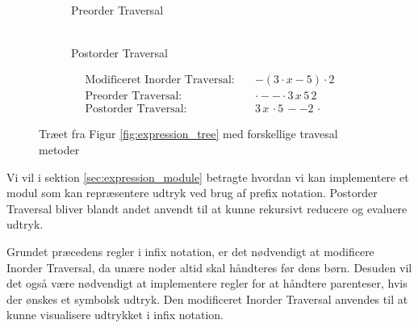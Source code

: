 \begin{figure}[H]
\begin{subfigure}{0.3\textwidth}
    \caption{\\Preorder Traversal}
  \end{subfigure}
  \hfill
  \begin{subfigure}{0.3\textwidth}
    \centering
    \caption{\\Postorder Traversal}
  \end{subfigure}
  \begin{align*}
      \text{Modificeret Inorder Traversal:} \quad & - (3 \cdot x - 5) \cdot 2 \\
      \text{Preorder Traversal:} \quad &  \cdot - - \cdot 3\, x\, 5\, 2  \\
      \text{Postorder Traversal:} \quad & 3\, x\, \cdot 5\, - -  2\, \cdot
  \end{align*}
  \caption{Træet fra Figur \ref{fig:expression_tree} med forskellige travesal metoder}
  \label{fig:expression_tree_traversal}
\end{figure}


Vi vil i sektion \ref{sec:expression_module} betragte hvordan vi kan implementere et modul som kan repræsentere udtryk ved brug af prefix notation.
Postorder Traversal bliver blandt andet anvendt til at kunne rekursivt reducere og evaluere udtryk.

Grundet præcedens regler i infix notation, er det nødvendigt at modificere Inorder Traversal, da unære noder altid skal håndteres før dens børn. Desuden vil det også være nødvendigt at implementere regler for at håndtere parenteser, hvis der ønskes et symbolsk udtryk. Den modificeret Inorder Traversal anvendes til at kunne visualisere udtrykket i infix notation.



